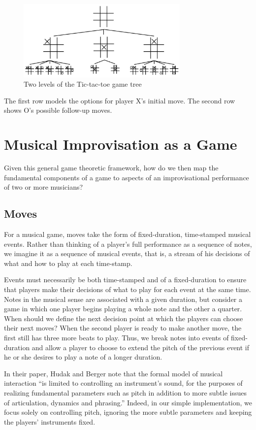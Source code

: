 \documentclass{article}
\begin{document}
\begin{figure}[b]
\centering
\includegraphics[width=84mm]{ttt.jpg}
\caption{Two levels of the Tic-tac-toe game tree}
\end{figure}

The first row models the options for player X's initial move.  The second row 
shows O's possible follow-up moves.

\section{Musical Improvisation as a
Game}

Given this general game theoretic framework, how do we then map the
fundamental components of a game to aspects of an improvisational
performance of two or more musicians?

\subsection{Moves}
For a musical game, moves take the form of fixed-duration, time-stamped
musical events.\cite{hudakberger95}  Rather than thinking of a player's full performance as a
sequence of notes, we imagine it as a sequence of musical events, that
is, a stream of his decisions of what and how to play at each
time-stamp.

Events must necessarily be both time-stamped and of a fixed-duration to
ensure that players make their decisions of what to play for each event
at the same time. Notes in the musical sense are associated with a given
duration, but consider a game in which one player begins playing a whole
note and the other a quarter.  When should we define the next decision
point at which the players can choose their next moves? When the second
player is ready to make another move, the first still has three more
beats to play. Thus, we break notes into events of fixed-duration and
allow a player to choose to extend the pitch of the previous event if he
or she desires to play a note of a longer duration.

In their paper, Hudak and Berger note that the formal model of musical interaction
``is limited to controlling an instrument's sound, for the purposes of
realizing fundamental parameters such as pitch in addition to more
subtle issues of articulation, dynamics and phrasing.''\cite{hudakberger95}  Indeed, in our
simple implementation, we focus solely on controlling pitch, ignoring
the more subtle parameters and keeping the players' instruments fixed.
\end{document}

